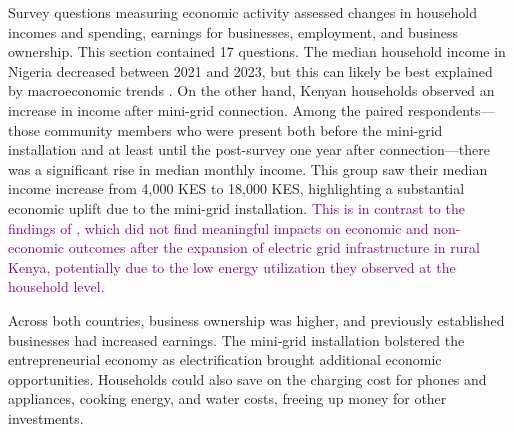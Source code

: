 Survey questions measuring economic activity assessed changes in household incomes and spending, earnings for businesses, employment, and business ownership. This section contained 17 questions. The median household income in Nigeria decreased between 2021 and 2023, but this can likely be best explained by macroeconomic trends \cite{wb-nigeria-2,wb-nigeria-1}. On the other hand, Kenyan households observed an increase in income after mini-grid connection.
Among the paired respondents---those community members who were present both before the mini-grid installation and at least until the post-survey one year after connection---there was a significant rise in median monthly income. This group saw their median income increase from 4,000 KES to 18,000 KES, highlighting a substantial economic uplift due to the mini-grid installation. \textcolor{purple}{This is in contrast to the findings of \cite{lee2020experimental}, which did not find meaningful impacts on economic and non-economic outcomes after the expansion of electric grid infrastructure in rural Kenya, potentially due to the low energy utilization they observed at the household level.}

Across both countries, business ownership was higher, and previously established businesses had increased earnings. The mini-grid installation bolstered the entrepreneurial economy as electrification brought additional economic opportunities. Households could also save on the charging cost for phones and appliances, cooking energy, and water costs, freeing up money for other investments.